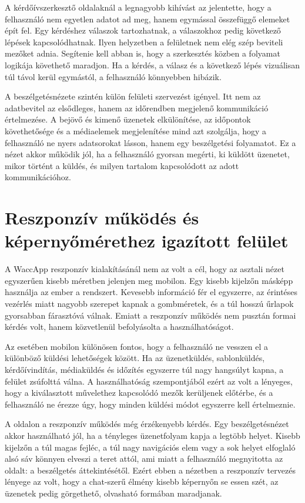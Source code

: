 A kérdőívszerkesztő oldalaknál a legnagyobb kihívást az jelentette, hogy a felhasználó nem egyetlen adatot ad meg, hanem egymással összefüggő elemeket épít fel. Egy kérdéshez válaszok tartozhatnak, a válaszokhoz pedig következő lépések kapcsolódhatnak. Ilyen helyzetben a felületnek nem elég szép beviteli mezőket adnia. Segítenie kell abban is, hogy a szerkesztés közben a folyamat logikája követhető maradjon. Ha a kérdés, a válasz és a következő lépés vizuálisan túl távol kerül egymástól, a felhasználó könnyebben hibázik.

A  beszélgetésnézete szintén külön felületi szervezést igényel. Itt nem az adatbevitel az elsődleges, hanem az időrendben megjelenő kommunikáció értelmezése. A bejövő és kimenő üzenetek elkülönítése, az időpontok követhetősége és a médiaelemek megjelenítése mind azt szolgálja, hogy a felhasználó ne nyers adatsorokat lásson, hanem egy beszélgetési folyamatot. Ez a nézet akkor működik jól, ha a felhasználó gyorsan megérti, ki küldött üzenetet, mikor történt a küldés, és milyen tartalom kapcsolódott az adott kommunikációhoz.

\section{Reszponzív működés és képernyőmérethez igazított felület}

A WaccApp reszponzív kialakításánál nem az volt a cél, hogy az asztali nézet egyszerűen kisebb méretben jelenjen meg mobilon. Egy kisebb kijelzőn másképp használja az ember a rendszert. Kevesebb információ fér el egyszerre, az érintéses vezérlés miatt nagyobb szerepet kapnak a gombméretek, és a túl hosszú űrlapok gyorsabban fárasztóvá válnak. Emiatt a reszponzív működés nem pusztán formai kérdés volt, hanem közvetlenül befolyásolta a használhatóságot.

Az  esetében mobilon különösen fontos, hogy a felhasználó ne vesszen el a különböző küldési lehetőségek között. Ha az üzenetküldés, sablonküldés, kérdőívindítás, médiaküldés és időzítés egyszerre túl nagy hangsúlyt kapna, a felület zsúfolttá válna. A használhatóság szempontjából ezért az volt a lényeges, hogy a kiválasztott művelethez kapcsolódó mezők kerüljenek előtérbe, és a felhasználó ne érezze úgy, hogy minden küldési módot egyszerre kell értelmeznie.

A  oldalon a reszponzív működés még érzékenyebb kérdés. Egy beszélgetésnézet akkor használható jól, ha a tényleges üzenetfolyam kapja a legtöbb helyet. Kisebb kijelzőn a túl magas fejléc, a túl nagy navigációs elem vagy a sok helyet elfoglaló alsó sáv könnyen elveszi a teret attól, ami miatt a felhasználó megnyitotta az oldalt: a beszélgetés áttekintésétől. Ezért ebben a nézetben a reszponzív tervezés lényege az volt, hogy a chat-szerű élmény kisebb képernyőn se essen szét, az üzenetek pedig görgethető, olvasható formában maradjanak.

